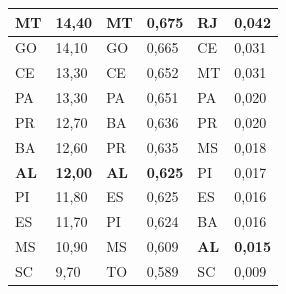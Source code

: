 \begin{table}[H]
\begin{tabular}{|l|l|l|l|l|l|}
		MT                          & 14,40                         & MT                     & 0,675                                    & RJ                              & 0,042                             \\ \hline
		GO                          & 14,10                         & GO                     & 0,665                                    & CE                              & 0,031                             \\ \hline
		CE                          & 13,30                         & CE                     & 0,652            & MT      & 0,031     \\ \hline
		PA                          & 13,30                         & PA                     & 0,651                                    & PA                              & 0,020                             \\ \hline
		PR                          & 12,70                         & BA                     & 0,636                                    & PR                              & 0,020                             \\ \hline
		BA                          & 12,60                         & PR                     & 0,635                                    & MS                              & 0,018                             \\ \hline
		\textbf{AL}                 & \textbf{12,00}                & \textbf{AL}            & \textbf{0,625}                           & PI                              & 0,017                             \\ \hline
		PI                          & 11,80                         & ES                     & 0,625                                    & ES                              & 0,016                             \\ \hline
		ES                          & 11,70                         & PI                     & 0,624                                    & BA                              & 0,016                             \\ \hline
		MS                          & 10,90                         & MS                     & 0,609                                    & \textbf{AL}                     & \textbf{0,015}                    \\ \hline
		SC                          & 9,70                          & TO                     & 0,589                                    & SC                              & 0,009                             \\ \hline

\end{tabular}
\end{table}
